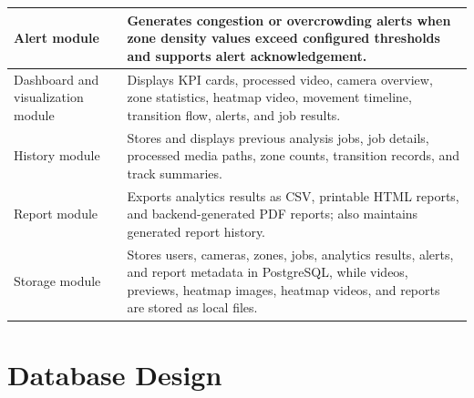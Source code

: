 \documentclass[12pt,a4paper]{report}
\begin{document}
\begin{longtable}{|p{4cm}|p{10cm}|}
Alert module & Generates congestion or overcrowding alerts when zone density values exceed configured thresholds and supports alert acknowledgement. \\
\hline

Dashboard and visualization module & Displays KPI cards, processed video, camera overview, zone statistics, heatmap video, movement timeline, transition flow, alerts, and job results. \\
\hline

History module & Stores and displays previous analysis jobs, job details, processed media paths, zone counts, transition records, and track summaries. \\
\hline

Report module & Exports analytics results as CSV, printable HTML reports, and backend-generated PDF reports; also maintains generated report history. \\
\hline

Storage module & Stores users, cameras, zones, jobs, analytics results, alerts, and report metadata in PostgreSQL, while videos, previews, heatmap images, heatmap videos, and reports are stored as local files. \\
\hline

\end{longtable}

\section{Database Design}
\end{document}
